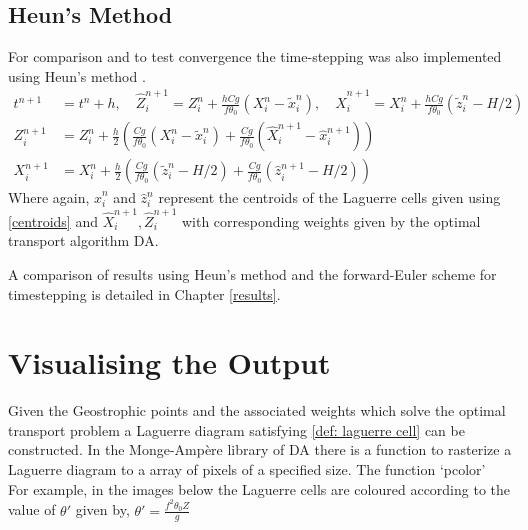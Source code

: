 \subsection{Heun's Method}
For comparison and to test convergence the time-stepping was also implemented using Heun's method \cite{Griffiths2010}.
\begin{equation}
	\begin{aligned}
	t^{n+1} &= t^{n} + h, \quad
	\hat{Z}_i^{n+1} = Z_i^n +  \frac{hCg}{f\theta_0}\left(X_i^n-\tilde{x}_i^n\right), \quad
	\hat{X}_i^{n+1}  = X_i^n +  \frac{hCg}{f\theta_0}\left(\tilde{z}_i^n-H/2\right)\\
	Z_i^{n+1} &= Z_i^n + \frac{h}{2}\left( \frac{Cg}{f\theta_0}\left(X_i^n-\tilde{x}_i^n\right)+ \frac{Cg}{f\theta_0}\left(\hat{X}_i^{n+1}-\hat{x}_i^{n+1}\right)\right)\\
	X_i^{n+1}  &= X_i^n + \frac{h}{2}\left( \frac{Cg}{f\theta_0}\left(\tilde{z}_i^n-H/2\right) + \frac{Cg}{f\theta_0}\left(\hat{z}_i^{n+1}-H/2\right)\right)
	\end{aligned}
\end{equation}
Where again, $\hat{x}_i^n$ and $\hat{z}_i^n$ represent the centroids of the Laguerre cells given using \ref{centroids} and $\hat{X}_i^{n+1},\hat{Z}_i^{n+1}$ with corresponding weights given by the optimal transport algorithm DA.

A comparison of results using Heun's method and the forward-Euler scheme for timestepping is detailed in Chapter \ref{results}.
\section{Visualising the Output \label{plotting}}
Given the Geostrophic points and the associated weights which solve the optimal transport problem a Laguerre diagram satisfying \ref{def: laguerre cell} can be constructed. In the Monge-Amp\`{e}re library of DA \cite{Merigot2017,Merigot2017a} there is a function to rasterize a Laguerre diagram to a array of pixels of a specified size. The function \textquoteleft pcolor\textquoteright \ \\
\linebreak
For example, in the images below the Laguerre cells are coloured according to the value of $\theta '$ given by, $\theta ' = \frac{f^2\theta_0 Z}{g}$
